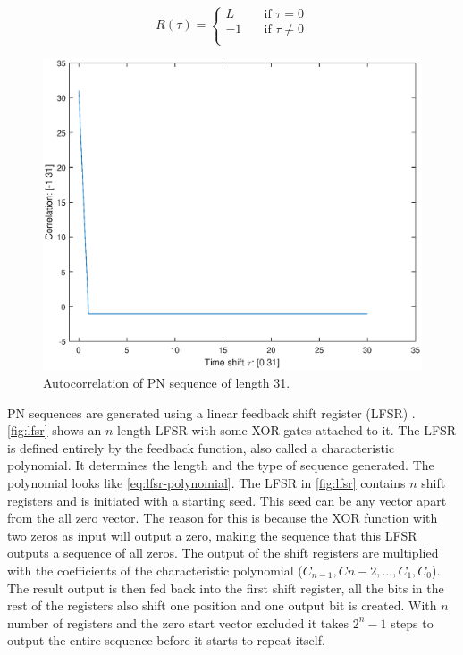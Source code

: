 		\begin{equation}
			\label{eq:autocorr-pn}
			R(\tau) = 
				\begin{cases}
					L    & \quad \text{if } \tau = 0 \\
					-1   & \quad \text{if } \tau \neq 0 \\
				\end{cases}
		\end{equation}

		\begin{figure}
			\centering
			\includegraphics[width=\textwidth]{chapters/CDMA/autocorr-pn.eps}
			\caption{Autocorrelation of PN sequence of length 31.}
			\label{fig:autocorr-pn}
		\end{figure}

		PN sequences are generated using a linear feedback shift register (LFSR) \cite{Wang:1988:LFS:52007.52024}.
		\autoref{fig:lfsr} shows an $n$ length LFSR with some XOR gates attached to it.
		The LFSR is defined entirely by the feedback function, also called a characteristic polynomial.
		It determines the length and the type of sequence generated.
		The polynomial looks like \autoref{eq:lfsr-polynomial}.
		The LFSR in \autoref{fig:lfsr} contains $n$ shift registers and is initiated with a starting seed.
		This seed can be any vector apart from the all zero vector.
		The reason for this is because the XOR function with two zeros as input will output a zero, making the sequence that this LFSR outputs a sequence of all zeros.
		The output of the shift registers are multiplied with the coefficients of the characteristic polynomial ($C_{n-1}, C{n-2}, \dotsc, C_1, C_0$).
		The result output is then fed back into the first shift register, all the bits in the rest of the registers also shift one position and one output bit is created.
		With $n$ number of registers and the zero start vector excluded it takes $2^n - 1$ steps to output the entire sequence before it starts to repeat itself.



